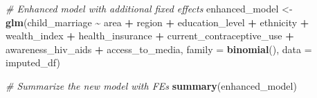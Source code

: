 \documentclass[
]{article}
\newenvironment{Shaded}{\begin{snugshade}}{\end{snugshade}}
\newcommand{\AttributeTok}[1]{\textcolor[rgb]{0.13,0.29,0.53}{#1}}
\newcommand{\CommentTok}[1]{\textcolor[rgb]{0.56,0.35,0.01}{\textit{#1}}}
\newcommand{\FunctionTok}[1]{\textcolor[rgb]{0.13,0.29,0.53}{\textbf{#1}}}
\newcommand{\NormalTok}[1]{#1}
\newcommand{\OtherTok}[1]{\textcolor[rgb]{0.56,0.35,0.01}{#1}}
\newcommand{\SpecialCharTok}[1]{\textcolor[rgb]{0.81,0.36,0.00}{\textbf{#1}}}
\begin{document}
\begin{Shaded}
\begin{Highlighting}[]
\CommentTok{\# Enhanced model with additional fixed effects}
\NormalTok{enhanced\_model }\OtherTok{\textless{}{-}} \FunctionTok{glm}\NormalTok{(child\_marriage }\SpecialCharTok{\textasciitilde{}}\NormalTok{ area }\SpecialCharTok{+}\NormalTok{ region }\SpecialCharTok{+}\NormalTok{ education\_level }\SpecialCharTok{+}\NormalTok{ ethnicity }\SpecialCharTok{+}\NormalTok{ wealth\_index }\SpecialCharTok{+}\NormalTok{ health\_insurance }\SpecialCharTok{+}\NormalTok{ current\_contraceptive\_use }\SpecialCharTok{+}\NormalTok{ awareness\_hiv\_aids }\SpecialCharTok{+}\NormalTok{ access\_to\_media, }
                      \AttributeTok{family =} \FunctionTok{binomial}\NormalTok{(), }
                      \AttributeTok{data =}\NormalTok{ imputed\_df)}

\CommentTok{\# Summarize the new model with FEs}
\FunctionTok{summary}\NormalTok{(enhanced\_model)}
\end{Highlighting}
\end{Shaded}
\end{document}
